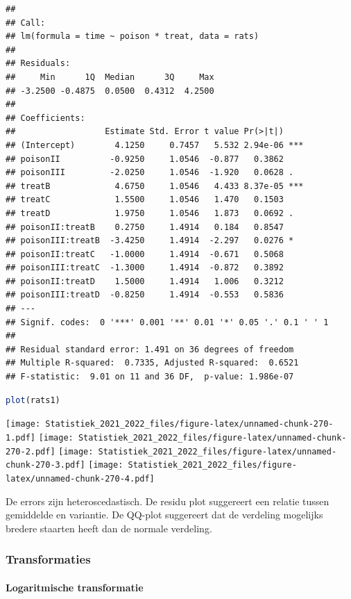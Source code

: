 \documentclass[
  12pt,dutch,coursenotes]{book}
\theoremstyle{definition}
\theoremstyle{definition}
\theoremstyle{definition}
\theoremstyle{definition}
\theoremstyle{remark}
\begin{document}
\begin{lstlisting}
## 
## Call:
## lm(formula = time ~ poison * treat, data = rats)
## 
## Residuals:
##     Min      1Q  Median      3Q     Max 
## -3.2500 -0.4875  0.0500  0.4312  4.2500 
## 
## Coefficients:
##                  Estimate Std. Error t value Pr(>|t|)    
## (Intercept)        4.1250     0.7457   5.532 2.94e-06 ***
## poisonII          -0.9250     1.0546  -0.877   0.3862    
## poisonIII         -2.0250     1.0546  -1.920   0.0628 .  
## treatB             4.6750     1.0546   4.433 8.37e-05 ***
## treatC             1.5500     1.0546   1.470   0.1503    
## treatD             1.9750     1.0546   1.873   0.0692 .  
## poisonII:treatB    0.2750     1.4914   0.184   0.8547    
## poisonIII:treatB  -3.4250     1.4914  -2.297   0.0276 *  
## poisonII:treatC   -1.0000     1.4914  -0.671   0.5068    
## poisonIII:treatC  -1.3000     1.4914  -0.872   0.3892    
## poisonII:treatD    1.5000     1.4914   1.006   0.3212    
## poisonIII:treatD  -0.8250     1.4914  -0.553   0.5836    
## ---
## Signif. codes:  0 '***' 0.001 '**' 0.01 '*' 0.05 '.' 0.1 ' ' 1
## 
## Residual standard error: 1.491 on 36 degrees of freedom
## Multiple R-squared:  0.7335, Adjusted R-squared:  0.6521 
## F-statistic:  9.01 on 11 and 36 DF,  p-value: 1.986e-07
\end{lstlisting}

\begin{lstlisting}[language=R]
plot(rats1)
\end{lstlisting}

\texttt{[image: Statistiek\_2021\_2022\_files/figure-latex/unnamed-chunk-270-1.pdf]} \texttt{[image: Statistiek\_2021\_2022\_files/figure-latex/unnamed-chunk-270-2.pdf]} \texttt{[image: Statistiek\_2021\_2022\_files/figure-latex/unnamed-chunk-270-3.pdf]} \texttt{[image: Statistiek\_2021\_2022\_files/figure-latex/unnamed-chunk-270-4.pdf]}

De errors zijn heteroscedastisch. De residu plot suggereert een relatie tussen gemiddelde en variantie. De QQ-plot suggereert dat de verdeling mogelijks bredere staarten heeft dan de normale verdeling.

\hypertarget{transformaties}{%
\subsubsection{Transformaties}\label{transformaties}}

\hypertarget{logaritmische-transformatie}{%
\paragraph{Logaritmische transformatie}\label{logaritmische-transformatie}}
\end{document}

